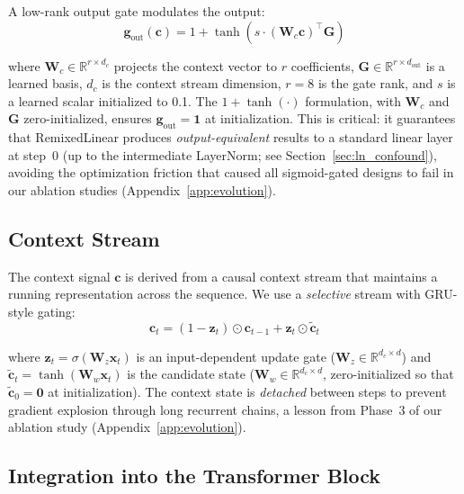 \documentclass[11pt]{article}
\begin{document}
A low-rank output gate modulates the output:
\begin{equation}
\mathbf{g}_\text{out}(\mathbf{c}) = 1 + \tanh\!\left(s \cdot (\mathbf{W}_c \mathbf{c})^\top \mathbf{G}\right)
\end{equation}

\noindent where $\mathbf{W}_c \in \mathbb{R}^{r \times d_c}$ projects the context vector to $r$ coefficients, $\mathbf{G} \in \mathbb{R}^{r \times d_\text{out}}$ is a learned basis, $d_c$ is the context stream dimension, $r{=}8$ is the gate rank, and $s$ is a learned scalar initialized to 0.1. The $1 + \tanh(\cdot)$ formulation, with $\mathbf{W}_c$ and $\mathbf{G}$ zero-initialized, ensures $\mathbf{g}_\text{out} = \mathbf{1}$ at initialization. This is critical: it guarantees that RemixedLinear produces \emph{output-equivalent} results to a standard linear layer at step~0 (up to the intermediate LayerNorm; see Section~\ref{sec:ln_confound}), avoiding the optimization friction that caused all sigmoid-gated designs to fail in our ablation studies (Appendix~\ref{app:evolution}).

\subsection{Context Stream}
\label{sec:context}

The context signal $\mathbf{c}$ is derived from a causal context stream that maintains a running representation across the sequence. We use a \emph{selective} stream with GRU-style gating:
\begin{equation}
\mathbf{c}_t = (1 - \mathbf{z}_t) \odot \mathbf{c}_{t-1} + \mathbf{z}_t \odot \tilde{\mathbf{c}}_t
\end{equation}

\noindent where $\mathbf{z}_t = \sigma(\mathbf{W}_z \mathbf{x}_t)$ is an input-dependent update gate ($\mathbf{W}_z \in \mathbb{R}^{d_c \times d}$) and $\tilde{\mathbf{c}}_t = \tanh(\mathbf{W}_w \mathbf{x}_t)$ is the candidate state ($\mathbf{W}_w \in \mathbb{R}^{d_c \times d}$, zero-initialized so that $\tilde{\mathbf{c}}_0 = \mathbf{0}$ at initialization). The context state is \emph{detached} between steps to prevent gradient explosion through long recurrent chains, a lesson from Phase~3 of our ablation study (Appendix~\ref{app:evolution}).

\subsection{Integration into the Transformer Block}
\end{document}
